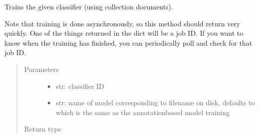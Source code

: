 \documentclass[letterpaper,10pt,english]{sphinxmanual}
\begin{document}
\begin{fulllineitems}
\begin{fulllineitems}
\label{\detokenize{autoapi/pine/client/index:pine.client.PineClient.classifier_train}}
\sphinxAtStartPar
Trains the given classifier (using collection documents).

\sphinxAtStartPar
Note that training is done asynchronously, so this method should return very quickly.  One
of the things returned in the dict will be a job ID.  If you want to know when the training
has finished, you can periodically poll {\hyperref[\detokenize{autoapi/pine/client/index:pine.client.PineClient.get_classifier_running_jobs}]{}} and check
for that job ID.
\begin{quote}\begin{description}
\item[{Parameters}] \leavevmode\begin{itemize}
\item {} 
\sphinxAtStartPar
{} \textendash{} str: classifier ID

\item {} 
\sphinxAtStartPar
{} \textendash{} str: name of model corresponding to filename on disk, defaults to
 which is the same as the annotation\sphinxhyphen{}based
model training

\end{itemize}

\item[{Return type}] \leavevmode
\sphinxAtStartPar
{}

\end{description}\end{quote}

\end{fulllineitems}


\end{fulllineitems}
\end{document}
